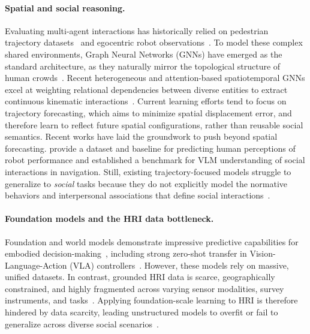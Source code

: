 \documentclass{article}
\begin{document}
\paragraph{Spatial and social reasoning.}

Evaluating multi-agent interactions has historically relied on pedestrian trajectory datasets~\cite{pellegrini2009you, lerner2007crowds, robicquet2016learning} and egocentric robot observations~\cite{martin2019jrdb, karnan2022socially}.
To model these complex shared environments, Graph Neural Networks (GNNs) have emerged as the standard architecture, as they naturally mirror the topological structure of human crowds~\cite{mohamed2020social, kosaraju2019social}.
Recent heterogeneous and attention-based spatiotemporal GNNs excel at weighting relational dependencies between diverse entities to extract continuous kinematic interactions~\cite{li2025pedestrian, li2025unified}.
Current learning efforts tend to focus on trajectory forecasting, which aims to minimize spatial displacement error, and therefore learn to reflect future spatial configurations, rather than reusable social semantics.
Recent works have laid the groundwork to push beyond spatial forecasting.
\citet{zhang2023predicting} provide a dataset and baseline for predicting human perceptions of robot performance and \citet{munje2025socialnavsub} established a benchmark for VLM understanding of social interactions in navigation.
Still, existing trajectory-focused models struggle to generalize to \textit{social} tasks because they do not explicitly model the normative behaviors and interpersonal associations that define social interactions~\cite{thompson2025social, tsoi2022sean}.

\paragraph{Foundation models and the HRI data bottleneck.}
Foundation and world models demonstrate impressive predictive capabilities for embodied decision-making~\cite{bommasani2021opportunities, hafner2023mastering, bruce2024genie, parkerholder2024genie2}, including strong zero-shot transfer in Vision-Language-Action (VLA) controllers~\cite{o2024open, zitkovich2023rt, kim2024openvla}.
However, these models rely on massive, unified datasets.
In contrast, grounded HRI data is scarce, geographically constrained, and highly fragmented across varying sensor modalities, survey instruments, and tasks~\cite{duncan2024survey, ondras2022human, bu2024ssup, heinisch2024physiological,heo2024diverse, thompson2021conversational, yang2021dataset, shrestha2024natsgd}.
Applying foundation-scale learning to HRI is therefore hindered by data scarcity, leading unstructured models to overfit or fail to generalize across diverse social scenarios~\cite{lisondra2026embodied}.
\end{document}
